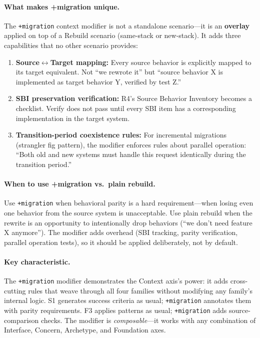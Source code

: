 \documentclass[11pt,a4paper,openright,twoside]{report}
\begin{document}
\paragraph{What makes +migration unique.}
The \texttt{+migration} context modifier is not a standalone scenario---it is an \textbf{overlay} applied on top of a Rebuild scenario (same-stack or new-stack). It adds three capabilities that no other scenario provides:

\begin{enumerate}[nosep]
  \item \textbf{Source$\leftrightarrow$Target mapping:} Every source behavior is explicitly mapped to its target equivalent. Not ``we rewrote it'' but ``source behavior X is implemented as target behavior Y, verified by test Z.''
  \item \textbf{SBI preservation verification:} R4's Source Behavior Inventory becomes a checklist. Verify does not pass until every SBI item has a corresponding implementation in the target system.
  \item \textbf{Transition-period coexistence rules:} For incremental migrations (strangler fig pattern), the modifier enforces rules about parallel operation: ``Both old and new systems must handle this request identically during the transition period.''
\end{enumerate}

\paragraph{When to use +migration vs.\ plain rebuild.}
Use \texttt{+migration} when behavioral parity is a hard requirement---when losing even one behavior from the source system is unacceptable. Use plain rebuild when the rewrite is an opportunity to intentionally drop behaviors (``we don't need feature X anymore''). The modifier adds overhead (SBI tracking, parity verification, parallel operation tests), so it should be applied deliberately, not by default.

\paragraph{Key characteristic.}
The \texttt{+migration} modifier demonstrates the Context axis's power: it adds cross-cutting rules that weave through all four families without modifying any family's internal logic. S1 generates success criteria as usual; \texttt{+migration} annotates them with parity requirements. F3 applies patterns as usual; \texttt{+migration} adds source-comparison checks. The modifier is \emph{composable}---it works with any combination of Interface, Concern, Archetype, and Foundation axes.
\end{document}
